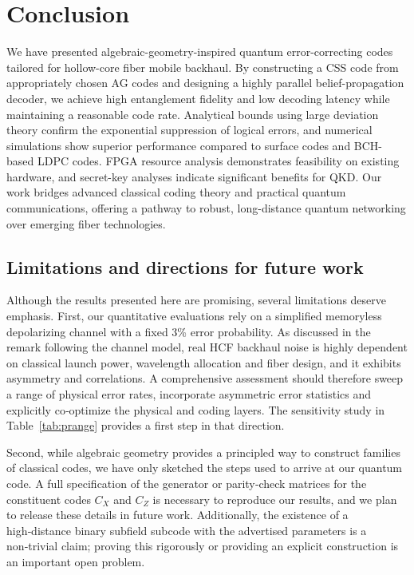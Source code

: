 \documentclass[conference]{IEEEtran}  %
\begin{document}
\section{Conclusion}\label{sec:conclusion}
We have presented algebraic-geometry-inspired quantum error-correcting codes tailored for hollow-core fiber mobile backhaul. By constructing a CSS code from appropriately chosen AG codes and designing a highly parallel belief-propagation decoder, we achieve high entanglement fidelity and low decoding latency while maintaining a reasonable code rate. Analytical bounds using large deviation theory confirm the exponential suppression of logical errors, and numerical simulations show superior performance compared to surface codes and BCH-based LDPC codes. FPGA resource analysis demonstrates feasibility on existing hardware, and secret-key analyses indicate significant benefits for QKD. Our work bridges advanced classical coding theory and practical quantum communications, offering a pathway to robust, long-distance quantum networking over emerging fiber technologies.

\subsection*{Limitations and directions for future work}
Although the results presented here are promising, several limitations deserve emphasis.  First, our quantitative evaluations rely on a simplified memoryless depolarizing channel with a fixed 3\% error probability.  As discussed in the remark following the channel model, real HCF backhaul noise is highly dependent on classical launch power, wavelength allocation and fiber design, and it exhibits asymmetry and correlations.  A comprehensive assessment should therefore sweep a range of physical error rates, incorporate asymmetric error statistics and explicitly co‑optimize the physical and coding layers.  The sensitivity study in Table~\ref{tab:prange} provides a first step in that direction.

Second, while algebraic geometry provides a principled way to construct families of classical codes, we have only sketched the steps used to arrive at our quantum code.  A full specification of the generator or parity‑check matrices for the constituent codes $C_X$ and $C_Z$ is necessary to reproduce our results, and we plan to release these details in future work.  Additionally, the existence of a high‑distance binary subfield subcode with the advertised parameters is a non‑trivial claim; proving this rigorously or providing an explicit construction is an important open problem.
\end{document}
